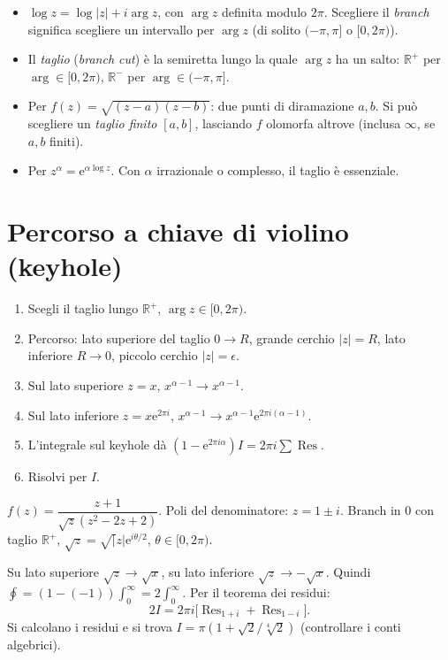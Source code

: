 \documentclass[11pt,a4paper,openany]{book}
\theoremstyle{definition}
\newcommand{\R}{\mathbb{R}}
\newcommand{\dd}{\mathrm{d}}
\newcommand{\eu}{\mathrm{e}}
\DeclareMathOperator{\Res}{Res}
\begin{document}
\begin{teoria}
\begin{itemize}
\item $\log z=\log|z|+i\arg z$, con $\arg z$ definita modulo $2\pi$. Scegliere il \emph{branch} significa scegliere un intervallo per $\arg z$ (di solito $(-\pi,\pi]$ o $[0,2\pi)$).
\item Il \emph{taglio} (\emph{branch cut}) \`e la semiretta lungo la quale $\arg z$ ha un salto: $\R^+$ per $\arg\in[0,2\pi)$, $\R^-$ per $\arg\in(-\pi,\pi]$.
\item Per $f(z)=\sqrt{(z-a)(z-b)}$: due punti di diramazione $a,b$. Si pu\`o scegliere un \emph{taglio finito} $[a,b]$, lasciando $f$ olomorfa altrove (inclusa $\infty$, se $a,b$ finiti).
\item Per $z^\alpha=\eu^{\alpha\log z}$. Con $\alpha$ irrazionale o complesso, il taglio \`e essenziale.
\end{itemize}
\end{teoria}

\section{Percorso a chiave di violino (keyhole)}

\begin{algoritmo}[Keyhole per $\int_0^\infty x^{\alpha-1}R(x)\dd x$]
\begin{enumerate}
\item Scegli il taglio lungo $\R^+$, $\arg z\in[0,2\pi)$.
\item Percorso: lato superiore del taglio $0\to R$, grande cerchio $|z|=R$, lato inferiore $R\to 0$, piccolo cerchio $|z|=\epsilon$.
\item Sul lato superiore $z=x$, $x^{\alpha-1}\to x^{\alpha-1}$.
\item Sul lato inferiore $z=x\eu^{2\pi i}$, $x^{\alpha-1}\to x^{\alpha-1}\eu^{2\pi i(\alpha-1)}$.
\item L'integrale sul keyhole d\`a $(1-\eu^{2\pi i\alpha})I=2\pi i\sum\Res$.
\item Risolvi per $I$.
\end{enumerate}
\end{algoritmo}

\begin{esempio}[Scritto 03/07/2024, Es. 2]
$f(z)=\dfrac{z+1}{\sqrt z(z^2-2z+2)}$. Poli del denominatore: $z=1\pm i$. Branch in $0$ con taglio $\R^+$, $\sqrt z=\sqrt|z|\eu^{i\theta/2}$, $\theta\in[0,2\pi)$.

Su lato superiore $\sqrt z\to\sqrt x$, su lato inferiore $\sqrt z\to-\sqrt x$. Quindi $\oint=(1-(-1))\int_0^\infty=2\int_0^\infty$. Per il teorema dei residui:
$$2I=2\pi i\big[\Res_{1+i}+\Res_{1-i}\big].$$
Si calcolano i residui e si trova $I=\pi(1+\sqrt 2/\sqrt[4]{2})$ (controllare i conti algebrici).
\end{esempio}
\end{document}
